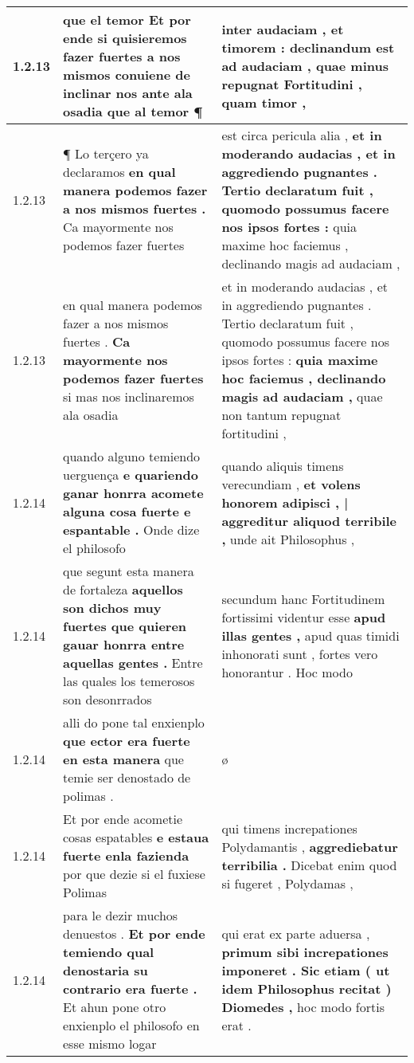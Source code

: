 \begin{tabular}{|p{1cm}|p{6.5cm}|p{6.5cm}|}
1.2.13 & que el temor \textbf{ Et por ende si quisieremos fazer fuertes a nos mismos conuiene de inclinar nos ante ala osadia } que al temor ¶ & inter audaciam , \textbf{ et timorem : declinandum est ad audaciam , quae minus repugnat Fortitudini , } quam timor , \\\hline
1.2.13 & ¶ Lo terçero ya declaramos \textbf{ en qual manera podemos fazer a nos mismos fuertes . } Ca mayormente nos podemos fazer fuertes & est circa pericula alia , \textbf{ et in moderando audacias , et in aggrediendo pugnantes . Tertio declaratum fuit , quomodo possumus facere nos ipsos fortes : } quia maxime hoc faciemus , declinando magis ad audaciam , \\\hline
1.2.13 & en qual manera podemos fazer a nos mismos fuertes . \textbf{ Ca mayormente nos podemos fazer fuertes } si mas nos inclinaremos ala osadia & et in moderando audacias , et in aggrediendo pugnantes . Tertio declaratum fuit , quomodo possumus facere nos ipsos fortes : \textbf{ quia maxime hoc faciemus , declinando magis ad audaciam , } quae non tantum repugnat fortitudini , \\\hline
1.2.14 & quando alguno temiendo uerguença \textbf{ e quariendo ganar honrra acomete alguna cosa fuerte e espantable . } Onde dize el philosofo & quando aliquis timens verecundiam , \textbf{ et volens honorem adipisci , | aggreditur aliquod terribile , } unde ait Philosophus , \\\hline
1.2.14 & que segunt esta manera de fortaleza \textbf{ aquellos son dichos muy fuertes que quieren gauar honrra entre aquellas gentes . } Entre las quales los temerosos son desonrrados & secundum hanc Fortitudinem fortissimi videntur esse \textbf{ apud illas gentes , } apud quas timidi inhonorati sunt , fortes vero honorantur . Hoc modo \\\hline
1.2.14 & alli do pone tal enxienplo \textbf{ que ector era fuerte en esta manera } que temie ser denostado de polimas . & ø \\\hline
1.2.14 & Et por ende acometie cosas espatables \textbf{ e estaua fuerte enla fazienda } por que dezie si el fuxiese Polimas & qui timens increpationes Polydamantis , \textbf{ aggrediebatur terribilia . } Dicebat enim quod si fugeret , Polydamas , \\\hline
1.2.14 & para le dezir muchos denuestos . \textbf{ Et por ende temiendo qual denostaria su contrario era fuerte . } Et ahun pone otro enxienplo el philosofo en esse mismo logar & qui erat ex parte aduersa , \textbf{ primum sibi increpationes imponeret . Sic etiam ( ut idem Philosophus recitat ) Diomedes , } hoc modo fortis erat . \\\hline

\end{tabular}

